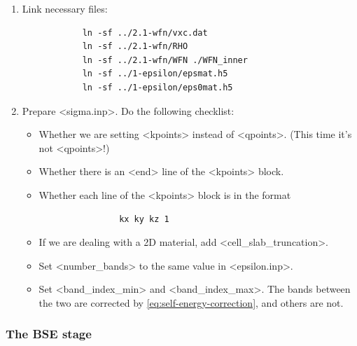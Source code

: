 \documentclass[hyperref, a4paper]{report}
\def\texttt#1{<#1>}%
\newcommand{\shortcode}[1]{\texttt{#1}}
\begin{document}
\begin{enumerate}
    \begin{enumerate}
        \item Link necessary files:
        \begin{lstlisting}
            ln -sf ../2.1-wfn/vxc.dat 
            ln -sf ../2.1-wfn/RHO 
            ln -sf ../2.1-wfn/WFN ./WFN_inner
            ln -sf ../1-epsilon/epsmat.h5 
            ln -sf ../1-epsilon/eps0mat.h5 
        \end{lstlisting}
        \item Prepare \shortcode{sigma.inp}. Do the following checklist:
        \begin{itemize}
            \item Whether we are setting \shortcode{kpoints} instead of \shortcode{qpoints}.
            (This time it's not \shortcode{qpoints}!)
            \item Whether there is an \shortcode{end} line of the \shortcode{kpoints} block.
            \item Whether each line of the \shortcode{kpoints} block is in the format
            \begin{lstlisting}
                kx ky kz 1
            \end{lstlisting}
            \item If we are dealing with a 2D material, add \shortcode{cell_slab_truncation}.
            \item Set \shortcode{number_bands} to the same value in \shortcode{epsilon.inp}.
            \item Set \shortcode{band_index_min} and \shortcode{band_index_max}.
            The bands between the two are corrected by \eqref{eq:self-energy-correction},
            and others are not.
        \end{itemize}
    \end{enumerate}
\end{enumerate}

\subsubsection{The BSE stage}
\end{document}
